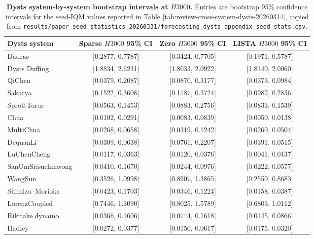 \begin{table}[ht]
\centering
\tiny
\setlength{\tabcolsep}{4pt}
\begin{tabular}{p{}ccc}
\toprule
Dysts system & Sparse $H3000$ 95\% CI & Zero $H3000$ 95\% CI & LISTA $H3000$ 95\% CI \\
\midrule
Dadras & [0.2877, 0.7787] & [0.3424, 0.7705] & [0.1971, 0.5787] \\
Dysts Duffing & [1.8834, 2.6231] & [1.8033, 2.0922] & [1.8140, 2.0060] \\
QiChen & [0.0379, 0.2087] & [0.0870, 0.3177] & [0.0373, 0.0984] \\
Sakarya & [0.1522, 0.3608] & [0.1187, 0.3724] & [0.0982, 0.2856] \\
SprottTorus & [0.0563, 0.1453] & [0.0883, 0.2756] & [0.0833, 0.1539] \\
Chua & [0.0102, 0.0291] & [0.0083, 0.0839] & [0.0050, 0.0138] \\
MultiChua & [0.0268, 0.0658] & [0.0319, 0.1242] & [0.0260, 0.0504] \\
DequanLi & [0.0309, 0.0638] & [0.0761, 0.2207] & [0.0391, 0.0515] \\
LuChenCheng & [0.0117, 0.0363] & [0.0120, 0.0376] & [0.0041, 0.0137] \\
SanUmSrisuchinwong & [0.0410, 0.1670] & [0.0244, 0.0976] & [0.0222, 0.0577] \\
WangSun & [0.3526, 1.0998] & [0.8907, 1.3865] & [0.2550, 0.8683] \\
Shimizu--Morioka & [0.0423, 0.1703] & [0.0346, 0.1224] & [0.0158, 0.0387] \\
LorenzCoupled & [0.7446, 1.3090] & [0.8025, 1.5789] & [0.6803, 1.0112] \\
Rikitake dynamo & [0.0366, 0.1606] & [0.0744, 0.1618] & [0.0145, 0.0866] \\
Hadley & [0.0272, 0.0377] & [0.0150, 0.0617] & [0.0175, 0.0320] \\
\bottomrule
\end{tabular}
\caption{\textbf{Dysts system-by-system bootstrap intervals at $H3000$.} Entries are bootstrap 95\% confidence intervals for the seed-IQM values reported in Table \ref{tab:review-cross-system-dysts-20260314}, copied from \texttt{results/paper\_seed\_statistics\_20260331/forecasting\_dysts\_appendix\_seed\_stats.csv}.}
\label{tab:review-cross-system-dysts-ci-h3000-20260314}
\end{table}

